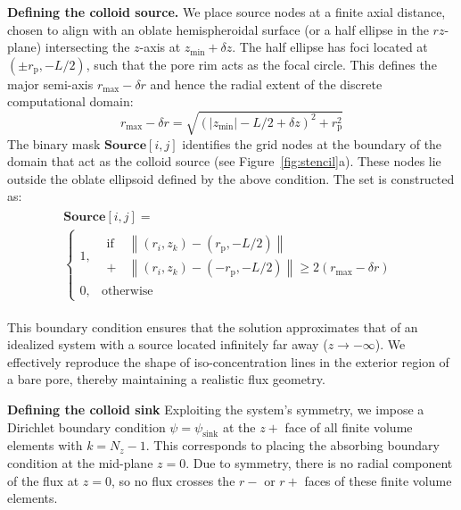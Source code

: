 \documentclass[10pt, a4paper, twocolumn]{article}
\begin{document}
\bigskip\noindent
\textbf{Defining the colloid source.}
We place source nodes at a finite axial distance, chosen to align with an oblate hemispheroidal surface (or a half ellipse in the $rz$-plane) intersecting the $z$-axis at $z_{\text{min}} + \delta z$.
The half ellipse has foci located at $(\pm r_{\text{p}}, -L/2)$, such that the pore rim acts as the focal circle.
This defines the major semi-axis $r_{\text{max}} - \delta r$ and hence the radial extent of the discrete computational domain:
\begin{equation}
    r_{\text{max}} - \delta r = \sqrt{(|z_{\text{min}}| - L/2 + \delta z)^2 + r_{\text{p}}^2}
\end{equation}
The binary mask $\textbf{Source}[i,j]$ identifies the grid nodes at the boundary of the domain that act as the colloid source (see Figure~\ref{fig:stencil}a).
These nodes lie outside the oblate ellipsoid defined by the above condition.
The set is constructed as:
\begin{eqnarray}
    \begin{gathered}
        \textbf{Source}[i,j] = \\
        \begin{cases}
        1, & 
        \begin{aligned}
            \text{if } &\left\lVert (r_i, z_k) - (r_{\text{p}}, -L/2) \right\rVert \\
            +  &\left\lVert (r_i, z_k) - (-r_{\text{p}}, -L/2) \right\rVert \ge 2(r_{\text{max}} - \delta r)
        \end{aligned} \\
        0, & \text{otherwise}
        \end{cases}
    \end{gathered}
\end{eqnarray}

This boundary condition ensures that the solution approximates that of an idealized system with a source located infinitely far away ($z \to -\infty$).
We effectively reproduce the shape of iso-concentration lines in the exterior region of a bare pore, thereby maintaining a realistic flux geometry.

\bigskip\noindent
\textbf{Defining the colloid sink}
Exploiting the system's symmetry, we impose a Dirichlet boundary condition $\psi = \psi_{\text{sink}}$ at the $z+$ face of all finite volume elements with $k = N_z - 1$.
This corresponds to placing the absorbing boundary condition at the mid-plane $z = 0$.
Due to symmetry, there is no radial component of the flux at $z = 0$, so no flux crosses the $r-$ or $r+$ faces of these finite volume elements.
\end{document}
